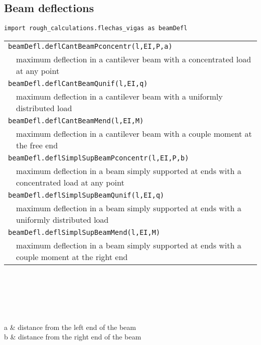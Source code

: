 \subsection{Beam deflections}
\begin{verbatim}
import rough_calculations.flechas_vigas as beamDefl
\end{verbatim}
\begin{center}
\begin{tabular}{p{3cm}p{9.5cm}}
\multicolumn{2}{l}{{\tt beamDefl.deflCantBeamPconcentr(l,EI,P,a)}} \\
& maximum deflection in a cantilever beam with a concentrated load at any point \\
\multicolumn{2}{l}{{\tt beamDefl.deflCantBeamQunif(l,EI,q)}} \\
& maximum deflection in a cantilever beam with a uniformly distributed load\\
\multicolumn{2}{l}{{\tt beamDefl.deflCantBeamMend(l,EI,M)}} \\
& maximum deflection in a cantilever beam with a couple moment at the free end\\
\multicolumn{2}{l}{{\tt beamDefl.deflSimplSupBeamPconcentr(l,EI,P,b)}} \\
& maximum deflection in a  beam simply supported at ends with a concentrated load at any point\\
\multicolumn{2}{l}{{\tt beamDefl.deflSimplSupBeamQunif(l,EI,q)}} \\
& maximum deflection in a beam simply supported at ends with a uniformly distributed load\\
\multicolumn{2}{l}{{\tt beamDefl.deflSimplSupBeamMend(l,EI,M)}} \\
& maximum deflection in a beam simply supported at ends with a couple moment at the right end\\
\end{tabular}
\end{center}

\begin{paramFuncTable}
\lSpan{} \\
\EI{} \\
\Pload{} \\
\qload{} \\
\Mcoup{} \\
a & distance from the left end of the beam \\
b & distance from the right end of the beam \\
\end{paramFuncTable}

